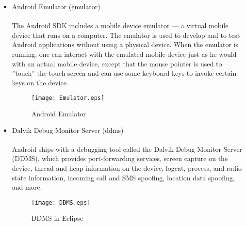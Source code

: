 \begin{itemize}
\begin{itemize}
\begin{figure}[htbp!]
   \label{fig:avdmanager}
\end{figure}
\pagebreak
\item Android Emulator (emulator)
\\\\The Android SDK includes a mobile device emulator — a virtual mobile device that runs on a computer. The emulator is used to develop and to test Android applications without using a physical device. When the emulator is running, one can interact with the emulated mobile device just as he would with an actual mobile device, except that the mouse pointer is used to ”touch” the touch screen and can use some keyboard keys to invoke certain keys on the device.
\begin{figure}[htbp!]   
   \centering           
   \texttt{[image: Emulator.eps]} 
   \caption{Android Emulator}
   \label{fig:androidemulator}
\end{figure}
\pagebreak
\item Dalvik Debug Monitor Server (ddms)
\\\\Android ships with a debugging tool called the Dalvik Debug Monitor Server (DDMS), which provides port-forwarding services, screen capture on the device, thread and heap information on the device, logcat, process, and radio state information, incoming call and SMS spoofing, location data spoofing, and more.
\begin{figure}[htbp!]   
   \centering           
   \texttt{[image: DDMS.eps]} 
   \caption{DDMS in Eclipse}
   \label{fig:ddms}
\end{figure}
\end{itemize}
\end{itemize}

